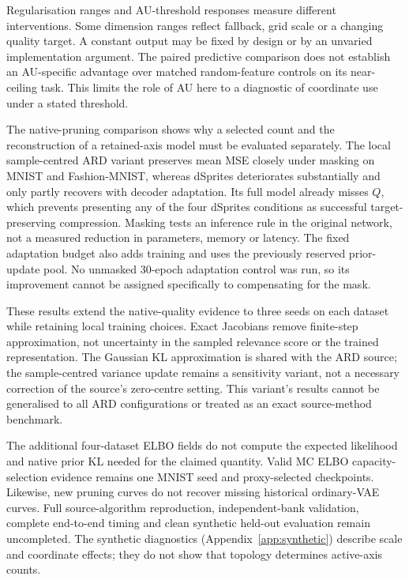 Regularisation ranges and AU-threshold responses measure different
interventions. Some dimension ranges reflect fallback, grid scale or a
changing quality target. A constant output may be fixed by design or by
an unvaried implementation argument. The paired predictive comparison
does not establish an AU-specific advantage over matched random-feature
controls on its near-ceiling task. This limits the role of AU here to
a diagnostic of coordinate use under a stated threshold.

The native-pruning comparison shows why a selected count and the
reconstruction of a retained-axis model must be evaluated separately.
The local sample-centred ARD variant preserves mean MSE closely under
masking on MNIST and Fashion-MNIST, whereas dSprites deteriorates
substantially and only partly recovers with decoder adaptation.
Its full model already misses $Q$, which prevents presenting any of
the four dSprites conditions as successful target-preserving compression.
Masking tests an inference rule in the original network, not a measured
reduction in parameters, memory or latency. The fixed adaptation
budget also adds training and uses the previously reserved prior-update
pool. No unmasked 30-epoch adaptation control was run, so its improvement
cannot be assigned specifically to compensating for the mask.

These results extend the native-quality evidence to three seeds on each
dataset while retaining local training choices. Exact Jacobians remove
finite-step approximation, not uncertainty in the sampled relevance
score or the trained representation. The Gaussian KL approximation is
shared with the ARD source; the sample-centred variance update remains
a sensitivity variant, not a necessary correction of the source's
zero-centre setting. This variant's results cannot be generalised to
all ARD configurations or treated as an exact source-method benchmark.

The additional four-dataset ELBO fields do not compute the expected
likelihood and native prior KL needed for the claimed quantity. Valid
MC ELBO capacity-selection evidence remains one MNIST seed and
proxy-selected checkpoints. Likewise, new pruning curves do not recover
missing historical ordinary-VAE curves. Full source-algorithm reproduction,
independent-bank validation, complete end-to-end timing and clean synthetic
held-out evaluation remain uncompleted. The synthetic diagnostics
(Appendix~\ref{app:synthetic}) describe scale and coordinate effects;
they do not show that topology determines active-axis counts.

